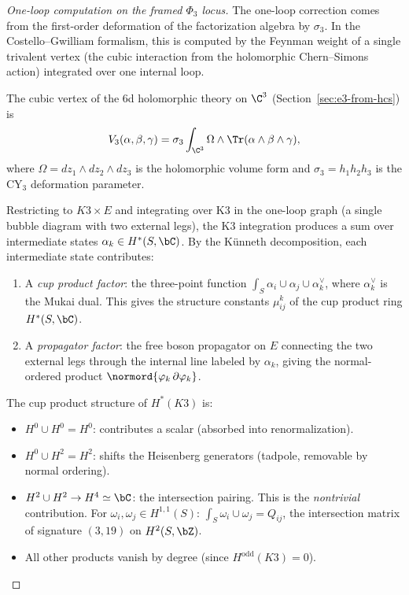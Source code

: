 \begin{proof}[One-loop computation on the framed \(\Phi_3\) locus]
The one-loop correction comes from the first-order deformation of
the factorization algebra by $\sigma_3$. In the
Costello--Gwilliam formalism, this is computed by the Feynman
weight of a single trivalent vertex (the cubic interaction from
the holomorphic Chern--Simons action) integrated over one internal
loop.

The cubic vertex of the 6d holomorphic theory on
$\C^3$ (Section~\ref{sec:e3-from-hcs}) is
\[
 V_3(\alpha, \beta, \gamma)
 = \sigma_3 \int_{\C^3} \Omega \wedge
 \Tr(\alpha \wedge \beta \wedge \gamma),
\]
where $\Omega = dz_1 \wedge dz_2 \wedge dz_3$ is the holomorphic
volume form and $\sigma_3 = h_1 h_2 h_3$ is the CY$_3$
deformation parameter.

Restricting to $K3 \times E$ and integrating over K3 in the one-loop
graph (a single bubble diagram with two external legs), the K3
integration produces a sum over intermediate states
$\alpha_k \in H^*(S, \bC)$. By the K\"unneth decomposition, each
intermediate state contributes:
\begin{enumerate}[label=(\roman*)]
\item A \emph{cup product factor}: the three-point function
$\int_S \alpha_i \cup \alpha_j \cup \alpha_k^{\vee}$, where
$\alpha_k^\vee$ is the Mukai dual. This gives the
structure constants $\mu^k_{ij}$ of the cup product ring
$H^*(S, \bC)$.
\item A \emph{propagator factor}: the free boson propagator
on $E$ connecting the two external legs through the
internal line labeled by $\alpha_k$, giving the normal-ordered
product $\normord{\varphi_k \,\partial\varphi_k}$.
\end{enumerate}

The cup product structure of $H^*(K3)$ is:
\begin{itemize}
\item $H^0 \cup H^0 = H^0$: contributes a scalar (absorbed into
 renormalization).
\item $H^0 \cup H^2 = H^2$: shifts the Heisenberg generators
 (tadpole, removable by normal ordering).
\item $H^2 \cup H^2 \to H^4 \simeq \bC$: the intersection pairing.
 This is the \emph{nontrivial} contribution. For
 $\omega_i, \omega_j \in H^{1,1}(S)$:
 $\int_S \omega_i \cup \omega_j = Q_{ij}$, the intersection
 matrix of signature $(3, 19)$ on $H^2(S, \bZ)$.
\item All other products vanish by degree (since
 $H^{\mathrm{odd}}(K3) = 0$).
\end{itemize}


\end{proof}

